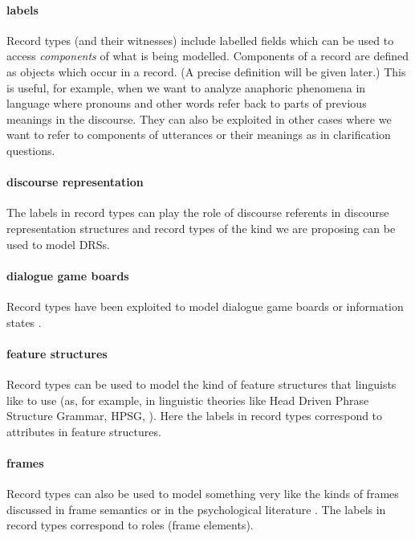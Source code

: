 \paragraph{labels} Record types (and their witnesses) include labelled
fields which can be used to access \textit{components} of what is being
modelled.  Components of a record are defined as objects which occur
in a record.  (A precise definition will be given later.)  This is useful, for example, when we want to analyze
anaphoric phenomena in language where pronouns and other words refer
back to parts of previous meanings in the discourse.  They can also be
exploited in other cases where we want to refer to components of
utterances or their meanings as in clarification questions.

\paragraph{discourse representation}  The labels in record types can
play the role of discourse referents in discourse representation
structures  \citep[DRSs,][]{KampReyle1993} and record types of the kind we are
proposing can be used to model DRSs.

\paragraph{dialogue game boards}  Record types have been exploited to
model dialogue game boards or information states \citep[see in
particular][]{Ginzburg2012}.

\paragraph{feature structures} Record types can be used to model the
kind of feature structures that linguists like to use (as, for example, in linguistic
theories like Head Driven Phrase Structure Grammar, HPSG,
\citealp{Sag:Wasow:ea:03}).  Here the labels in record types
correspond to attributes in feature structures.

\paragraph{frames}  Record types can also be used to model something
very like the kinds of frames discussed in frame semantics
\citep{Fillmore1982,Fillmore1985,RuppenhoferEllsworthPetruckJohnsonScheffczyk2006}
or in the psychological literature \citep{Barsalou1992a,Barsalou1999}.
The labels in record types correspond to roles (frame elements).

